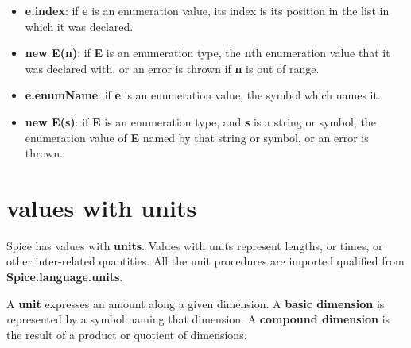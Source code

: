 \documentclass{report}
\begin{document}
\begin{itemize}\item {\bf e.index}: if {\bf e} is an enumeration value, its index is its position
in the list in which it was declared.

\item {\bf new E(n)}: if {\bf E} is an enumeration type, the {\bf n}th enumeration value that it
was declared with, or an error is thrown if {\bf n} is out of range.

\item {\bf e.enumName}: if {\bf e} is an enumeration value, the symbol which names it.

\item {\bf new E(s)}: if {\bf E} is an enumeration type, and {\bf s} is a string or symbol,
the enumeration value of {\bf E} named by that string or symbol, or an error
is thrown.

\end{itemize}

\section{values with units}


Spice has values with {\bf units}. Values with units represent lengths, or
times, or other inter-related quantities. All the unit procedures are
imported qualified from {\bf Spice.language.units}.

A {\bf unit} expresses an amount along a given dimension. A {\bf basic dimension} is
represented by a symbol naming that dimension. A {\bf compound dimension} is the
result of a product or quotient of dimensions.
\end{document}

